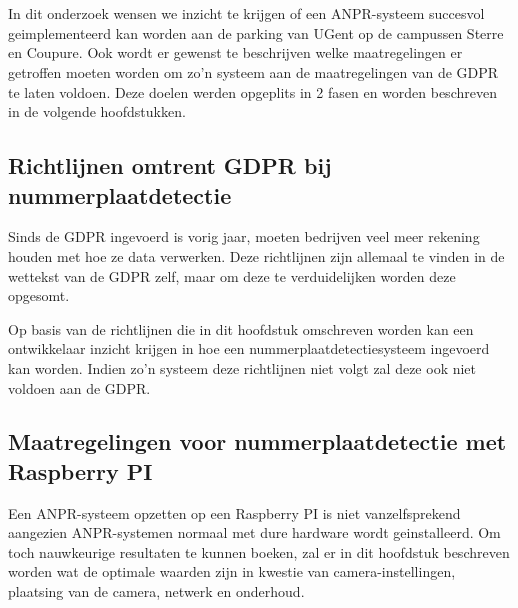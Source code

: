 
\chapter{}
\label{ch:methodologie}


In dit onderzoek wensen we inzicht te krijgen of een ANPR-systeem succesvol geimplementeerd kan worden aan de parking van UGent op de campussen Sterre en Coupure. Ook wordt er gewenst te beschrijven welke maatregelingen er getroffen moeten worden om zo'n systeem aan de maatregelingen van de GDPR te laten voldoen. Deze doelen werden opgeplits in 2 fasen en worden beschreven in de volgende hoofdstukken.

\section{Richtlijnen omtrent GDPR bij nummerplaatdetectie}
Sinds de GDPR ingevoerd is vorig jaar, moeten bedrijven veel meer rekening houden met hoe ze data verwerken. Deze richtlijnen zijn allemaal te vinden in de wettekst van de GDPR zelf, maar om deze te verduidelijken worden deze opgesomt.

Op basis van de richtlijnen die in dit hoofdstuk omschreven worden kan een ontwikkelaar inzicht krijgen in hoe een nummerplaatdetectiesysteem ingevoerd kan worden. Indien zo'n systeem deze richtlijnen niet volgt zal deze ook niet voldoen aan de GDPR. 

\section{Maatregelingen voor nummerplaatdetectie met Raspberry PI}
Een ANPR-systeem opzetten op een Raspberry PI is niet vanzelfsprekend aangezien ANPR-systemen normaal met dure hardware wordt geinstalleerd. Om toch nauwkeurige resultaten te kunnen boeken, zal er in dit hoofdstuk beschreven worden wat de optimale waarden zijn in kwestie van camera-instellingen, plaatsing van de camera, netwerk en onderhoud.


